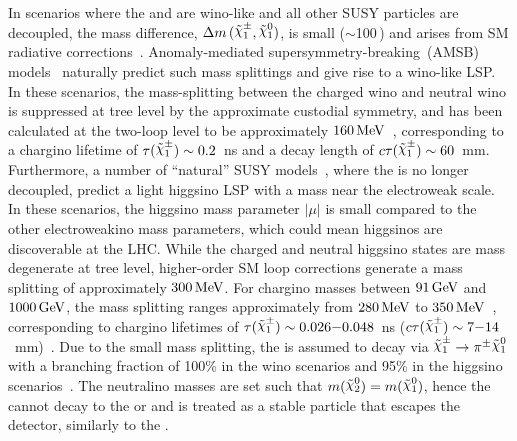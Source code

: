 In scenarios where the \ninoone and \chinoonepm are wino-like and all other SUSY particles are decoupled, the mass difference, $\mdiffchi$, is small ($\sim$100\,\MeV) and arises from SM radiative corrections~\cite{Ibe:2012sx,Fukuda:2017jmk}.
Anomaly-mediated supersymmetry-breaking~(AMSB) models~\cite{Giudice:1998xp,Randall:1998uk} naturally predict such mass splittings and give rise to a wino-like LSP.
In these scenarios, the mass-splitting between the charged wino and neutral wino is suppressed at tree level by the approximate custodial symmetry, 
and has been calculated at the two-loop level to be approximately $160\,\text{MeV}$~\cite{Ibe:2012sx}, corresponding to a chargino lifetime 
of $\tau(\chinoonepm) \sim 0.2$~ns and a decay length of $c\tau(\chinoonepm) \sim 60$~mm. 
Furthermore, a number of \enquote{natural} SUSY models~\cite{Papucci:2011wy,Barbieri:1987fn,deCarlos:1993yy}, where the \ninotwo is no longer decoupled, predict a light higgsino LSP with a mass near the electroweak scale.
In these scenarios, the higgsino mass parameter $|\mu|$ is small compared to the other electroweakino mass parameters, which could mean
higgsinos are discoverable at the LHC. While the charged and neutral higgsino states are mass degenerate at tree level, higher-order SM loop corrections generate a mass splitting of approximately $300\,\text{MeV}$.
For chargino masses between $91\,\text{GeV}$ and $1000\,\text{GeV}$, the mass splitting ranges approximately from $280\,\text{MeV}$ to $350\,\text{MeV}$~\cite{Thomas:1998wy}, 
corresponding to chargino lifetimes of $\tau(\chinoonepm) \sim 0.026{-}0.048$~ns ($c\tau(\chinoonepm) \sim 7{-}14$~mm)~\cite{Fukuda:2017jmk}. Due to the small mass splitting, the \chinoonepm is assumed to decay via $\chinoonepm \rightarrow \pi^\pm\ninoone$ with a branching fraction of 100\% in the wino scenarios and 95\% in the higgsino scenarios~\cite{Nagata:2014wma}. The neutralino masses are set such that $m(\ninotwo) = m(\ninoone)$, hence the \ninotwo cannot decay to the \chinoonepm or \ninoone and is treated as a stable particle that escapes the detector, similarly to the \ninoone. 

